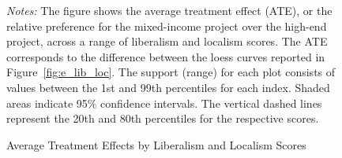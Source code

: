 \documentclass[article,11pt]{memoir}
\begin{document}
\begin{figure}[htb]\centering
  \caption{Average Treatment Effects by Liberalism and Localism Scores}
  \label{fig:e_ate}
  \begin{measuredfigure}
  \end{measuredfigure}
  \begin{tablenotes}[flushleft]
    \item \hspace{-.2em}\emph{Notes:} The figure shows the average treatment effect (ATE), or the relative preference for the mixed-income project over the high-end project, across a range of liberalism and localism scores.  The ATE corresponds to the difference between the loess curves reported in Figure~\ref{fig:e_lib_loc}.  The support (range) for each plot consists of values between the 1st and 99th percentiles for each index.  Shaded areas indicate 95\% confidence intervals. The vertical dashed lines represent the 20th and 80th percentiles for the respective scores.
  \end{tablenotes}
\end{figure}
\end{document}
